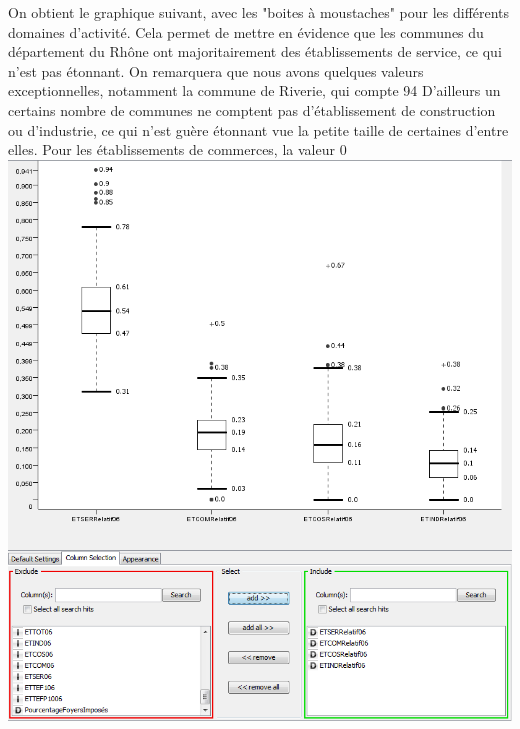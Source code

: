 On obtient le graphique suivant, avec les "boites à moustaches" pour les différents domaines d'activité. Cela permet de mettre en évidence que les communes du département du Rhône ont majoritairement des établissements de service, ce qui n'est pas étonnant. On remarquera que nous avons quelques valeurs exceptionnelles, notamment la commune de Riverie, qui compte 94%
D'ailleurs un certains nombre de communes ne comptent pas d'établissement de construction ou d'industrie, ce qui n'est guère étonnant vue la petite taille de certaines d'entre elles. Pour les établissements de commerces, la valeur 0%
\includegraphics{png/BoxPlotDomainesActivité.png}

